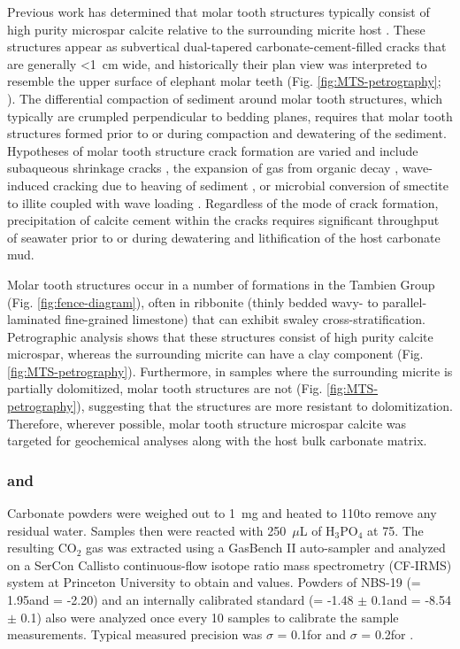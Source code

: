 Previous work has determined that molar tooth structures typically consist of high purity microspar calcite relative to the surrounding micrite host \citep{Smith1968a, Fairchild1997a, Pratt1998a}. These structures appear as subvertical dual-tapered carbonate-cement-filled cracks that are generally \textless1~cm wide, and historically their plan view was interpreted to resemble the upper surface of elephant molar teeth (Fig. \ref{fig:MTS-petrography}; \citealp{Bauerman1884a, Daly1912a}). The differential compaction of sediment around molar tooth structures, which typically are crumpled perpendicular to bedding planes, requires that molar tooth structures formed prior to or during compaction and dewatering of the sediment. Hypotheses of molar tooth structure crack formation are varied and include subaqueous shrinkage cracks \citep{Smith1968a}, the expansion of gas from organic decay \citep{Pollock2006a}, wave-induced cracking due to heaving of sediment \citep{Bishop2006a}, or microbial conversion of smectite to illite coupled with wave loading \citep{Hodgskiss2018a}. Regardless of the mode of crack formation, precipitation of calcite cement within the cracks requires significant throughput of seawater prior to or during dewatering and lithification of the host carbonate mud.

Molar tooth structures occur in a number of formations in the Tambien Group (Fig. \ref{fig:fence-diagram}), often in ribbonite (thinly bedded wavy- to parallel-laminated fine-grained limestone) that can exhibit swaley cross-stratification. Petrographic analysis shows that these structures consist of high purity calcite microspar, whereas the surrounding micrite can have a clay component (Fig. \ref{fig:MTS-petrography}). Furthermore, in samples where the surrounding micrite is partially dolomitized, molar tooth structures are not (Fig. \ref{fig:MTS-petrography}), suggesting that the structures are more resistant to dolomitization. Therefore, wherever possible, molar tooth structure microspar calcite was targeted for geochemical analyses along with the host bulk carbonate matrix.

\subsubsection{\dC and \dO}

Carbonate powders were weighed out to 1~mg and heated to 110\degreesC to remove any residual water. Samples then were reacted with 250~$\mu$L of H$_{3}$PO$_{4}$ at 75\degreesC. The resulting CO$_{2}$ gas was extracted using a GasBench II auto-sampler and analyzed on a SerCon Callisto continuous-flow isotope ratio mass spectrometry (CF-IRMS) system at Princeton University to obtain \dC and \dO values. Powders of NBS-19 (\dC = 1.95\permil and \dO = -2.20\permil) and an internally calibrated standard (\dC = -1.48 $\pm$ 0.1\permil and \dO = -8.54 $\pm$ 0.1\permil) also were analyzed once every 10 samples to calibrate the sample measurements. Typical measured precision was $\sigma$ = 0.1\permil for \dC and $\sigma$ = 0.2\permil for \dO.

